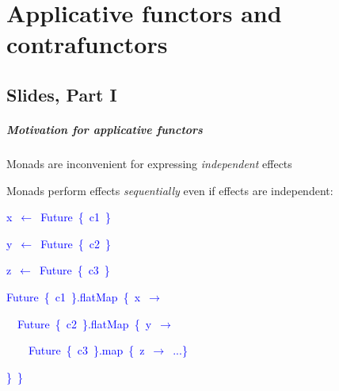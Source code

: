 
\chapter{Applicative functors and contrafunctors\label{chap:8-Applicative-functors,-contrafunc}}

\section{Slides, Part I}

\paragraph{Motivation for applicative functors}

\vspace{-0.25cm}Monads are inconvenient for expressing \emph{independent}
effects

Monads perform effects \emph{sequentially} even if effects are independent:\texttt{\textcolor{blue}{\footnotesize{}\medskip{}
}}{\footnotesize\par}

\texttt{\textcolor{blue}{\footnotesize{}}}%
\begin{minipage}[c][1\totalheight][t]{0.4\columnwidth}%
\begin{lyxcode}
\textcolor{blue}{\footnotesize{}x~$\leftarrow$~Future~\{~c1~\}}{\footnotesize\par}

\textcolor{blue}{\footnotesize{}y~$\leftarrow$~Future~\{~c2~\}}{\footnotesize\par}

\textcolor{blue}{\footnotesize{}z~$\leftarrow$~Future~\{~c3~\}}{\footnotesize\par}
\end{lyxcode}
%
\end{minipage}\texttt{\textcolor{blue}{\footnotesize{}\hfill{}}}%
\begin{minipage}[c][1\totalheight][t]{0.4\columnwidth}%
\begin{lyxcode}
\textcolor{blue}{\footnotesize{}Future~\{~c1~\}.flatMap~\{~x~$\rightarrow$}{\footnotesize\par}

\textcolor{blue}{\footnotesize{}~~Future~\{~c2~\}.flatMap~\{~y~$\rightarrow$}{\footnotesize\par}

\textcolor{blue}{\footnotesize{}~~~~Future~\{~c3~\}.map~\{~z~$\rightarrow$~...\}}{\footnotesize\par}

\textcolor{blue}{\footnotesize{}\}~\}}{\footnotesize\par}
\end{lyxcode}
%
\end{minipage}\texttt{\textcolor{blue}{\footnotesize{}\hfill{}\medskip{}
}}{\footnotesize\par}

